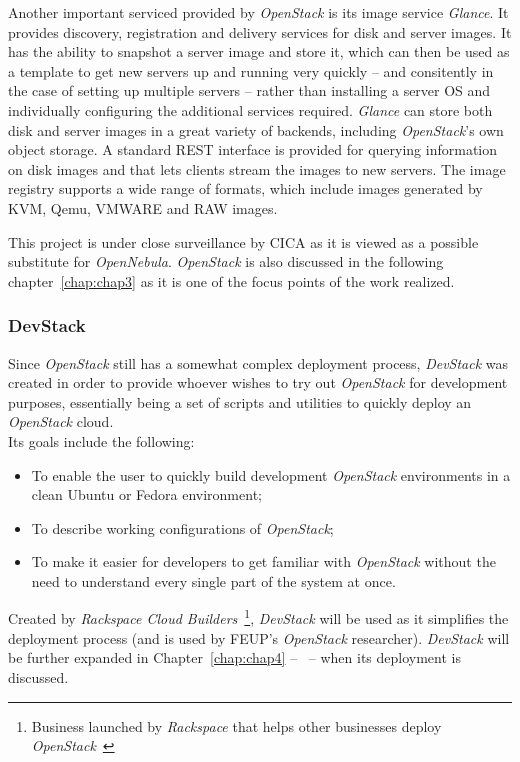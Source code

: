 Another important serviced provided by \textit{OpenStack} is its image service \textit{Glance}. It provides discovery, registration and delivery services for disk and server images. It has the ability to snapshot a server image and store it, which can then be used as a template to get new servers up and running very quickly -- and consitently in the case of setting up multiple servers -- rather than installing a server OS and individually configuring the additional services required. \textit{Glance} can store both disk and server images in a great variety of backends, including \textit{OpenStack}'s own object storage. A standard REST interface is provided for querying information on disk images and that lets clients stream the images to new servers. The image registry supports a wide range of formats, which include images generated by KVM, Qemu, VMWARE and RAW images.

This project is under close surveillance by CICA as it is viewed as a possible substitute for \textit{OpenNebula}. \textit{OpenStack} is also discussed in the following chapter~\ref{chap:chap3} as it is one of the focus points of the work realized.

\subsubsection{DevStack}\label{subsubsec:devstack}

Since \textit{OpenStack} still has a somewhat complex deployment process, \textit{DevStack} was created in order to provide whoever wishes to try out \textit{OpenStack} for development purposes, essentially being a set of scripts and utilities to quickly deploy an \textit{OpenStack} cloud.
\ \\
Its goals include the following:
\begin{itemize}
\item To enable the user to quickly build development \textit{OpenStack} environments in a clean Ubuntu or Fedora environment;
\item To describe working configurations of \textit{OpenStack}; 
\item To make it easier for developers to get familiar with \textit{OpenStack} without the need to understand every single part of the system at once.
\end{itemize}


Created by \textit{Rackspace Cloud Builders}~\footnote{Business launched by \textit{Rackspace} that helps other businesses deploy \textit{OpenStack}~\cite{cloudbuilders}}, \textit{DevStack} will be used as it simplifies the deployment process (and is used by FEUP's \textit{OpenStack} researcher). \textit{DevStack} will be further expanded in Chapter~\ref{chap:chap4} --~ -- when its deployment is discussed.

